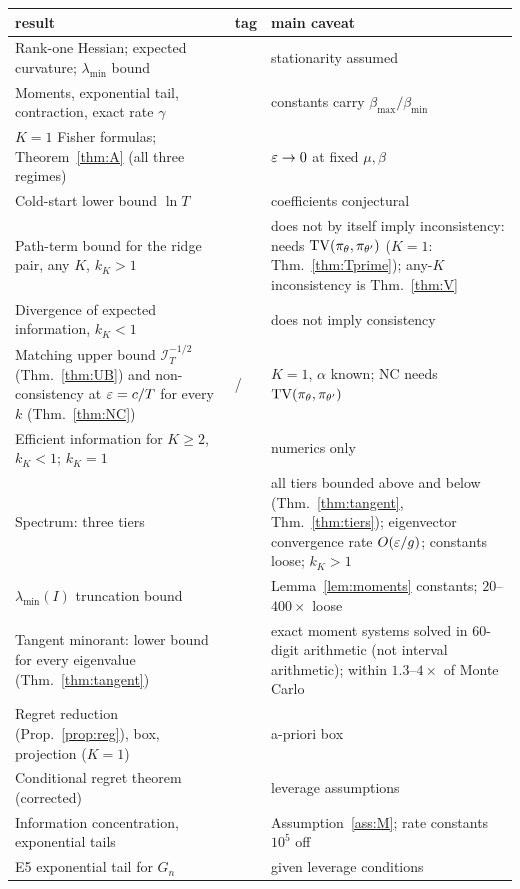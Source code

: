 \begin{center}\small
\begin{tabular}{@{}p{6.1cm}p{1.3cm}p{6.1cm}@{}}\toprule
result & tag & main caveat\\\midrule
Rank-one Hessian; expected curvature; $\lambda_{\min}$ bound & \Pt{} & stationarity assumed\\
Moments, exponential tail, contraction, exact rate $\gamma$ & \Pt{} & constants carry $\beta_{\max}/\beta_{\min}$\\
$K=1$ Fisher formulas; Theorem~\ref{thm:A} (all three regimes) & \Pt{} & $\varepsilon\to0$ at fixed $\mu,\beta$\\
Cold-start lower bound $\ln T$ & \Pt{} & coefficients conjectural\\
Path-term bound for the ridge pair, any $K$, $k_K>1$ & \Pt{} & does not by itself imply inconsistency: needs $\mathrm{TV}(\pi_\theta,\pi_{\theta'})$ ($K=1$: Thm.~\ref{thm:Tprime}); any-$K$ inconsistency is Thm.~\ref{thm:V}\\
Divergence of expected information, $k_K<1$ & \Pt{} & does not imply consistency\\
Matching upper bound $\mathcal I_T^{-1/2}$ (Thm.~\ref{thm:UB}) and non-consistency at $\varepsilon=c/T$ for every $k$ (Thm.~\ref{thm:NC}) & \Pt{}/\Ps{} & $K=1$, $\alpha$ known; NC needs $\mathrm{TV}(\pi_\theta,\pi_{\theta'})$\\
Efficient information for $K\ge2$, $k_K<1$; $k_K=1$ & \Ot{} & numerics only\\
Spectrum: three tiers & \Ps{} & all tiers bounded above and below (Thm.~\ref{thm:tangent}, Thm.~\ref{thm:tiers}); eigenvector convergence rate $O(\varepsilon/g)$; constants loose; $k_K>1$\\
$\lambda_{\min}(I)$ truncation bound & \Ps{} & Lemma~\ref{lem:moments} constants; $20$--$400\times$ loose\\
Tangent minorant: lower bound for every eigenvalue (Thm.~\ref{thm:tangent}) & \Pt{} & exact moment systems solved in 60-digit arithmetic (not interval arithmetic); within $1.3$--$4\times$ of Monte Carlo\\
Regret reduction (Prop.~\ref{prop:reg}), box, projection ($K=1$) & \Pt{} & a-priori box\\
Conditional regret theorem (corrected) & \Ps{} & leverage assumptions\\
Information concentration, exponential tails & \Ps{} & Assumption~\ref{ass:M}; rate constants $10^5$ off\\
E5 exponential tail for $G_n$ & \Pt{} & given leverage conditions\\

\end{tabular}
\end{center}
